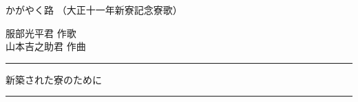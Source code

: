 \documentclass[10pt,b5j]{tarticle} %
\begin{document}
\begin{minipage}[c]{0.7\hsize} %
    \begin{center}
        {\LARGE
            かがやく路 %
        }
        {\small 
            （大正十一年新寮記念寮歌） %
        }
    \end{center}
\end{minipage}
\begin{minipage}[c]{0.3\hsize} %
    \begin{flushright} %
        服部光平君 作歌\\山本吉之助君 作曲 %
    \end{flushright}
\end{minipage}
\begin{minipage}[c]{0.7\hsize}
    \begin{center}
    {\large 
        \rule[0.0em]{1.5em}{0.05em} 新築された寮のために \rule[0.0em]{1.5em}{0.05em}
    }
    \end{center}
\end{minipage}
\end{document}
